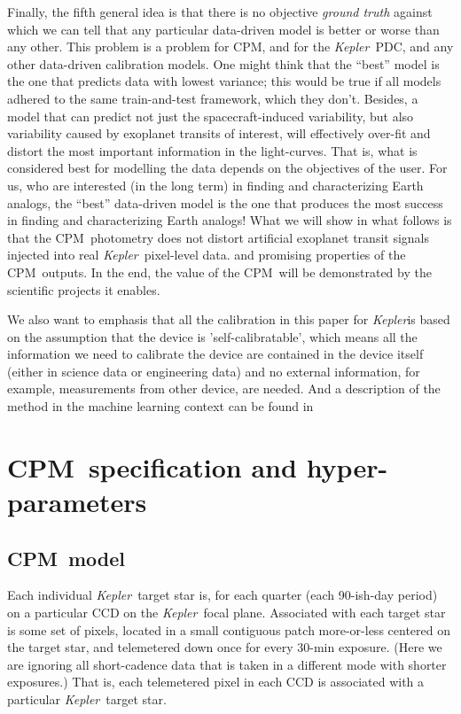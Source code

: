 \documentclass[12pt, preprint]{aastex}
\newcommand{\project}[1]{\textsl{#1}}
\newcommand{\Kepler}{\project{Kepler}}
\newcommand{\name}{CPM}
\begin{document}
Finally, the fifth general idea is that there is no objective \emph{ground truth} against which we can tell
  that any particular data-driven model is better or worse than any other.
This problem is a problem for \name, and for the \Kepler\ PDC, and any other data-driven calibration models.
One might think that the ``best'' model is the one that predicts data with lowest variance;
  this would be true if all models adhered to the same train-and-test framework, which they don't.
Besides, a model that can predict not just the spacecraft-induced variability,
  but also variability caused by exoplanet transits of interest,
  will effectively over-fit and distort the most important information in the light-curves.
That is, what is considered best for modelling the data depends on the objectives of the user.
For us, who are interested (in the long term) in finding and characterizing Earth analogs,
  the ``best'' data-driven model is the one that produces the most success in finding and characterizing Earth analogs!
What we will show in what follows is that the \name\ photometry does not distort
  artificial exoplanet transit signals injected into real \Kepler\ pixel-level data.
  and promising properties of the \name\ outputs.
In the end, the value of the \name\ will be demonstrated by the scientific projects it enables.

We also want to emphasis that all the calibration in this paper for \Kepler is 
  based on the assumption that the device is 'self-calibratable', 
  which means all the information we need to calibrate the device are contained in the device itself 
  (either in science data or engineering data) and no external information, 
  for example, measurements from other device, are needed.
  And a description of the method in the machine learning context can be found in \cite{icml}

\section{\name\ specification and hyper-parameters}
\subsection{\name\ model}
Each individual \Kepler\ target star is, for each quarter (each 90-ish-day period)
  on a particular CCD on the \Kepler\ focal plane.
Associated with each target star is some set of pixels,
  located in a small contiguous patch more-or-less centered on the target star,
  and telemetered down once for every 30-min exposure.
(Here we are ignoring all short-cadence data that is taken in a different mode with shorter exposures.)
That is, each telemetered pixel in each CCD is associated with a particular \Kepler\ target star.
\end{document}
